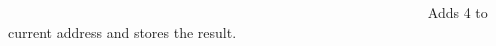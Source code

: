 ~\newline
~\newline
~\newline
~\newline
~\newline
~\newline
~\newline
~\newline
~\newline
~\newline
~\newline
~\newline
~\newline
~\newline
~\newline
~\newline
~\newline
~\newline
~\newline
~\newline
~\newline
~\newline
~\newline
~\newline
~\newline
~\newline
~\newline
~\newline
~\newline
~\newline
~\newline
~\newline
~\newline
~\newline
~\newline
~\newline
 Adds 4 to current address and stores the result.


